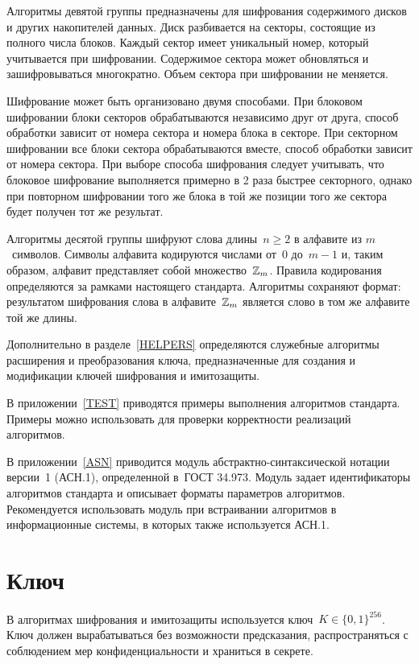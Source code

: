 Алгоритмы девятой группы предназначены для шифрования содержимого дисков и 
других накопителей данных. Диск разбивается на секторы, состоящие из полного 
числа блоков. Каждый сектор имеет уникальный номер, который учитывается при 
шифровании. Содержимое сектора может обновляться и зашифровываться многократно.
Объем сектора при шифровании не меняется.

Шифрование может быть организовано двумя способами. 
%
При блоковом шифровании блоки секторов обрабатываются независимо друг от друга,
способ обработки зависит от номера сектора и номера блока в секторе. 
%
При секторном шифровании все блоки сектора обрабатываются вместе,
способ обработки зависит от номера сектора.
%
При выборе способа шифрования следует учитывать, что блоковое шифрование 
выполняется примерно в 2 раза быстрее секторного, однако при повторном 
шифровании того же блока в той же позиции того же сектора будет получен тот же 
результат.

Алгоритмы десятой группы шифруют слова длины~$n\geq 2$
в алфавите из $m$~символов. Символы алфавита кодируются числами от~$0$ 
до~$m-1$ и, таким образом, алфавит представляет собой множество~$\mathbb{Z}_m$. 
Правила кодирования определяются за рамками настоящего стандарта. 
%
Алгоритмы сохраняют формат: 
результатом шифрования слова в алфавите~$\mathbb{Z}_m$ является слово в том
же алфавите той же длины.

Дополнительно в разделе~\ref{HELPERS} определяются
служебные алгоритмы расширения и преобразования ключа, 
предназначенные для создания и модификации ключей
шифрования и имитозащиты.

В приложении~\ref{TEST} приводятся примеры выполнения алгоритмов стандарта.
Примеры можно использовать для проверки корректности реализаций 
алгоритмов.

В приложении~\ref{ASN} приводится модуль
абстрактно-синтаксической нотации версии~1 (АСН.1),
определенной в~ГОСТ 34.973.
Модуль задает идентификаторы алгоритмов стандарта и описывает
форматы параметров алгоритмов. 
%
Рекомендуется использовать модуль 
при встраивании алгоритмов в информационные системы, 
в которых также используется АСН.1.

\section{Ключ}\label{COMMON.Key}

В алгоритмах шифрования и имитозащиты используется 
ключ~$K\in\{0,1\}^{256}$.
%
Ключ должен вырабатываться без возможности предсказания, 
распространяться с соблюдением мер конфиденциальности и храниться в секрете.

